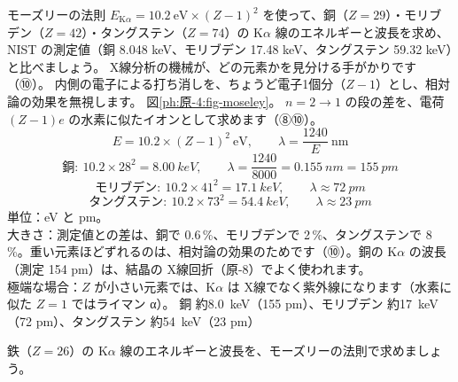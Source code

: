 \label{ph:原-4:ex9}
\begin{phreidai}
モーズリーの法則 $E_{\mathrm K\alpha}=10.2\ \text{eV}\times(Z-1)^2$ を使って、銅（$Z=29$）・モリブデン（$Z=42$）・タングステン（$Z=74$）の K$\alpha$ 線のエネルギーと波長を求め、NIST の測定値（銅 8.048 keV、モリブデン 17.48 keV、タングステン 59.32 keV）と比べましょう。
\phbamen
X線分析の機械が、どの元素かを見分ける手がかりです（⑩）。
\phmushi
内側の電子による打ち消しを、ちょうど電子1個分（$Z-1$）とし、相対論の効果を無視します。
\phzu
図\ref{ph:原-4:fig-moseley}。
\phriyu
$n=2\to1$ の段の差を、電荷 $(Z-1)e$ の水素に似たイオンとして求めます（⑧⑩）。
\phtateru
\[ E=10.2\times(Z-1)^2\ \mathrm{eV},\qquad\lambda=\frac{1240}{E}\ \mathrm{nm} \]
\phtoku
\[ \text{銅}:\ 10.2\times28^2=\qty{8.00}{keV},\qquad\lambda=\frac{1240}{8000}=\qty{0.155}{nm}=\qty{155}{pm} \]
\[ \text{モリブデン}:\ 10.2\times41^2=\qty{17.1}{keV},\qquad\lambda\approx\qty{72}{pm} \]
\[ \text{タングステン}:\ 10.2\times73^2=\qty{54.4}{keV},\qquad\lambda\approx\qty{23}{pm} \]
\phtashikame
単位：eV と pm。\\
大きさ：測定値との差は、銅で 0.6\,\%、モリブデンで 2\,\%、タングステンで 8\,\%。重い元素ほどずれるのは、相対論の効果のためです（⑩）。銅の K$\alpha$ の波長（測定 154 pm）は、結晶の X線回折（原-8）でよく使われます。\\
極端な場合：$Z$ が小さい元素では、K$\alpha$ は X線でなく紫外線になります（水素に似た $Z=1$ ではライマン α）。
\kotae 銅 約\qty{8.0}{keV}（155 pm）、モリブデン 約\qty{17}{keV}（72 pm）、タングステン 約\qty{54}{keV}（23 pm）
\end{phreidai}
\begin{jibun}
鉄（$Z=26$）の K$\alpha$ 線のエネルギーと波長を、モーズリーの法則で求めましょう。
\end{jibun}

